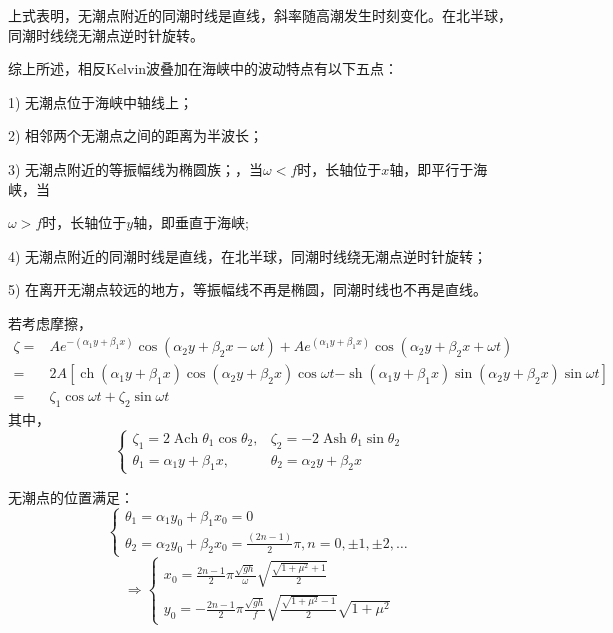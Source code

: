 \documentclass[a4paper,12pt]{article}
\begin{document}
	\indent
	上式表明，无潮点附近的同潮时线是直线，斜率随高潮发生时刻变化。在北半球，同潮时线绕无潮点逆时针旋转。
	\par
	综上所述，相反Kelvin波叠加在海峡中的波动特点有以下五点：
	\par
	1) 无潮点位于海峡中轴线上；
	\par
	2) 相邻两个无潮点之间的距离为半波长；
	\par
	3) 无潮点附近的等振幅线为椭圆族；，当$\omega<f$时，长轴位于$x$轴，即平行于海峡，当
	\par
	\indent
	\indent
	$\omega>f$时，长轴位于$y$轴，即垂直于海峡;
	\par
	4) 无潮点附近的同潮时线是直线，在北半球，同潮时线绕无潮点逆时针旋转；
	\par
	5) 在离开无潮点较远的地方，等振幅线不再是椭圆，同潮时线也不再是直线。
	\par
	若考虑摩擦，
	\[
		\begin{aligned} 
		\zeta=& A e^{-\left(\alpha_{1} y+\beta_{1} x\right)} \cos \left(\alpha_{2} y+\beta_{2} x-\omega t\right)+A e^{\left(\alpha_{1} y+\beta_{1} x\right)} \cos \left(\alpha_{2} y+\beta_{2} x+\omega t\right) \\
		=& 2 A\left[\operatorname{ch}\left(\alpha_{1} y+\beta_{1} x\right) \cos \left(\alpha_{2} y+\beta_{2} x\right) \cos \omega t\right.\left.-\operatorname{sh}\left(\alpha_{1} y+\beta_{1} x\right) \sin \left(\alpha_{2} y+\beta_{2} x\right) \sin \omega t\right] \\
		=&\zeta_1\cos\omega t+\zeta_2\sin\omega t 
		\end{aligned}
	\]
	其中，
	\[
	\left\{
	\begin{aligned}
	\zeta_{1}=2 \operatorname{Ach} \theta_{1} \cos \theta_{2},& \zeta_{2}=-2 \operatorname{Ash} \theta_{1} \sin \theta_{2}\\
	\theta_{1}=\alpha_{1} y+\beta_{1} x,& \theta_{2}=\alpha_{2} y+\beta_{2} x
	\end{aligned}
	\right.	
	\]
	\par
	无潮点的位置满足：
	\[
	\left\{\begin{array}{l}\theta_{1}=\alpha_{1} y_{0}+\beta_{1} x_{0}=0 \\ \theta_{2}=\alpha_{2} y_{0}+\beta_{2} x_{0}=\frac{(2 n-1)}{2} \pi, n=0,\pm 1,\pm 2, \ldots\end{array}\right.
	\]
	\[
	\Rightarrow	\left\{\begin{array}{l}x_{0}=\frac{2 n-1}{2} \pi \frac{\sqrt{g h}}{\omega} \sqrt{\frac{\sqrt{1+\mu^{2}}+1}{2}} \\ y_{0}=-\frac{2 n-1}{2} \pi \frac{\sqrt{g h}}{f} \sqrt{\frac{\sqrt{1+\mu^{2}}-1}{2}}\sqrt{1+\mu^2}\end{array}\right.
	\]
\end{document}
